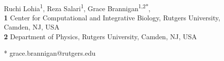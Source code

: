 \documentclass[10pt,letterpaper]{article}
\date{}
\renewcommand{\figurename}{Fig}
\begin{document}
\vspace*{0.2in}

\begin{flushleft}
{\Large
\textbf{} %
}
\newline
\\
Ruchi Lohia\textsuperscript{1},
Reza Salari\textsuperscript{1},
Grace Brannigan\textsuperscript{1,2*},
\\

\bigskip
\textbf{1} Center for Computational and Integrative Biology, Rutgers University, Camden, NJ, USA
\\
\textbf{2} Department of Physics, Rutgers University, Camden, NJ, USA
\\
\bigskip

% 
%

* grace.brannigan@rutgers.edu

\end{flushleft}





\linenumbers






\renewcommand{\thepage}{S\arabic{page}}  
\renewcommand{\thesection}{S\arabic{section}}   
\renewcommand{\thetable}{S\arabic{table}}   
\renewcommand{\figurename}{}
\renewcommand{\thefigure}{S\arabic{figure} Fig}
\end{document}
